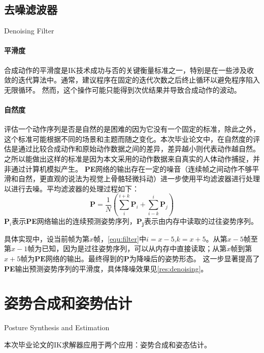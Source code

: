 \subsection{去噪滤波器}{Denoising Filter}
\paragraph{平滑度}
合成动作的平滑度是IK技术成功与否的关键衡量标准之一\cite{aristidou2018inverse}，特别是在一些涉及收敛的迭代算法中。通常，建议程序在固定的迭代次数之后终止循环以避免程序陷入无限循环。 然而，这个操作可能只能得到次优结果并导致合成动作的波动。
\paragraph{自然度}
评估一个动作序列是否是自然的是困难的因为它没有一个固定的标准，除此之外，这个标准可能根据不同的场景和主题而随之变化。本次毕业论文中，在自然度的评估是通过比较合成动作和原始动作数据之间的差异，差异越小则代表动作越自然。之所以能做出这样的标准是因为本文采用的动作数据来自真实的人体动作捕捉，并非通过计算机模拟产生。
\textbf{PE}网络的输出存在一定的噪音（连续帧之间动作不够平滑和自然，更直观的说法为视觉上骨骼轻微抖动）进一步使用平均滤波器进行处理以进行去噪。平均滤波器的处理过程如下：
\begin{equation}
	\label{equ:filter}
\mathbf{P} = \frac{1}{N} (\sum_i^{i+k} {\mathbf{P}_i}+\sum_{i-k}^i{\mathbf{P}_j})
\end{equation}
$\mathbf{P}_i$表示\textbf{PE}网络输出的连续预测姿势序列，$\mathbf{P_j}$表示由内存中读取的过往姿势序列。

具体实现中，设当前帧为第$x$帧，\ref{equ:filter}中$i=x-5$,$k=x+5$。从第$x-5$帧至第$x-1$帧为已知，因为是过往姿势序列，可以从内存中直接读取；从第$x$帧到第$x+5$帧为$\mathbf{PE}$网络的输出。最终得到的$\mathbf{P}$为降噪后的姿势形态。
\label{sec:denoising}
这一步显著提高了\textbf{PE}输出预测姿势序列的平滑度，具体降噪效果见\ref{res:denoising}。

\section{姿势合成和姿势估计}{Posture Synthesis and Estimation}

本次毕业论文的IK求解器应用于两个应用：姿势合成和姿态估计。

